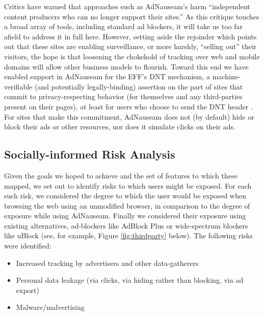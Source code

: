 \documentclass[conference]{IEEEtran}
\begin{document}
Critics have warned that approaches such as AdNauseam's harm “independent content producers who can no longer support their sites.” As this critique touches a broad array of tools, including standard ad blockers, it will take us too far afield to address it in full here.  However, setting aside the rejoinder which points out that these sites are enabling surveillance, or more harshly, “selling out” their visitors, the hope is that loosening the chokehold of tracking over web and mobile domains will allow other business models to flourish. Toward this end we have enabled support in AdNauseam for the EFF's DNT mechanism, a machine-verifiable (and potentially legally-binding) assertion on the part of sites that commit to privacy-respecting behavior (for themselves and any third-parties present on their pages), at least for users who choose to send the DNT header \cite{EFF-1,EFF-2}. For sites that make this commitment, AdNauseam does not (by default) hide or block their ads or other resources, nor does it simulate clicks on their ads.

\subsection{Socially-informed Risk Analysis}

Given the goals we hoped to achieve and the set of features to which these mapped, we set out to identify risks to which users might be exposed. For each such risk, we considered the degree to which the user would be exposed when browsing the web using an unmodified browser, in comparison to the degree of exposure while using AdNauseam. Finally we considered their exposure using existing alternatives, ad-blockers like AdBlock Plus \cite{AdBlock} or wide-spectrum blockers like uBlock \cite{Gorhill}(see, for example, Figure \ref{fig:thirdparty} below). The following risks were identified:

\vspace{2mm}
\begin{itemize}
  \item Increased tracking by advertisers and other data-gatherers
  \item Personal data leakage (via clicks, via hiding rather than blocking, via ad export)
  \item Malware/malvertising
\end{itemize}
\vspace{2mm}
\end{document}
